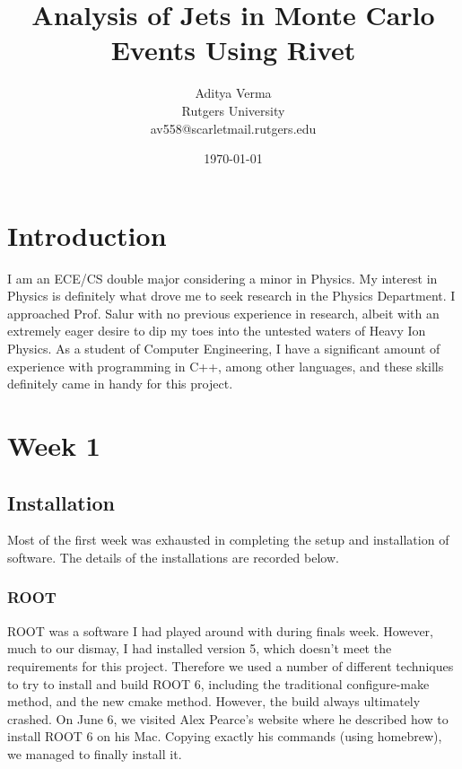 \documentclass{article}
\title{\Huge Analysis of Jets in Monte Carlo Events Using Rivet}
\author{\Large Aditya Verma\\ Rutgers University\\ av558@scarletmail.rutgers.edu}
\date{\today}
\begin{document}
\maketitle
{}

\newpage
\section{\huge Introduction}
I am an ECE/CS double major considering a minor in Physics. My interest in Physics is definitely what drove me to seek research in the Physics Department. I approached Prof. Salur with no previous experience in research, albeit with an extremely eager desire to dip my toes into the untested waters of Heavy Ion Physics. As a student of Computer Engineering, I have a significant amount of experience with programming in C++, among other languages, and these skills definitely came in handy for this project.
\vspace{0.5cm}
\section{Week 1}
\subsection{Installation}
Most of the first week was exhausted in completing the setup and installation of software. The details of the installations are recorded below.
\subsubsection{ROOT}
ROOT was a software I had played around with during finals week. However, much to our dismay, I had installed version 5, which doesn't meet the requirements for this project. Therefore we used a number of different techniques to try to install and build ROOT 6, including the traditional configure-make method, and the new cmake method. However, the build always ultimately crashed. On June 6, we visited Alex Pearce's website where he described how to install ROOT 6 on his Mac. Copying exactly his commands (using homebrew), we managed to finally install it.
\end{document}
